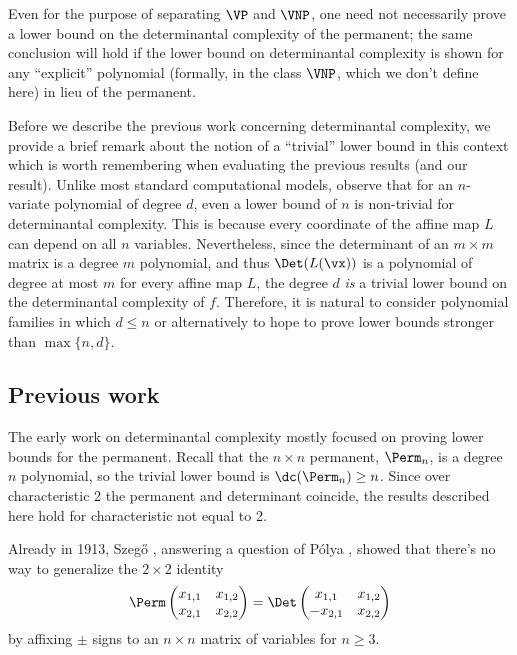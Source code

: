 Even for the purpose of separating $\VP$ and $\VNP$, one need not necessarily prove a lower bound on the determinantal complexity of the permanent;  the same conclusion will hold if the lower bound on determinantal complexity is shown for any ``explicit'' polynomial (formally, in the class $\VNP$, which we don't define here) in lieu of the permanent.

Before we describe the previous work concerning determinantal complexity, we provide a brief remark about the notion of a ``trivial'' lower bound in this context which is worth remembering when evaluating the previous results (and our result). Unlike most standard computational models, observe that for an $n$-variate polynomial of degree $d$, even a lower bound of $n$ is non-trivial for determinantal complexity. This is because every coordinate of the affine  map $L$ can depend on all $n$ variables. Nevertheless, since the determinant of an $m \times m$ matrix is a degree $m$ polynomial, and thus $\Det(L(\vx))$ is a polynomial of degree at most $m$ for every affine map $L$, the degree $d$ \emph{is} a trivial lower bound on the determinantal complexity of $f$. Therefore, it is natural to consider polynomial families in which $d \le n$ or alternatively to hope to prove lower bounds stronger than $\max\{n,d\}$.

\subsection{Previous work}\label{sec:previous results}

The early work on determinantal complexity mostly focused on proving lower bounds for the permanent. Recall that the $n \times n$ permanent, $\Perm_n$, is a degree $n$ polynomial, so the trivial lower bound is $\dc(\Perm_n) \ge n$. Since over characteristic 2 the permanent and determinant coincide, the results described here hold for characteristic not equal to 2.


Already in 1913, Szeg\H{o} \cite{Szego13}, answering a question of P\'{o}lya \cite{Polya13}, showed that there's no way to generalize the $2 \times 2$ identity
\[
\Perm
\begin{pmatrix}
x_{1,1} & x_{1,2} \\
x_{2,1} & x_{2,2}
\end{pmatrix}
=
\Det
\begin{pmatrix}
x_{1,1} & x_{1,2} \\
-x_{2,1} & x_{2,2}
\end{pmatrix}
\]
by affixing $\pm$ signs to an $n\times n$ matrix of variables for $n \ge 3$.

